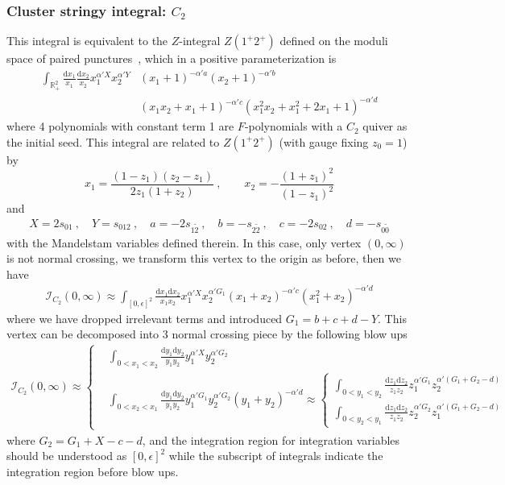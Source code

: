 \documentclass[12pt]{article}
\theoremstyle{definition}
\theoremstyle{plain}
\newcommand{\dif}{\mathrm{d}} %
\begin{document}
\subsubsection*{Cluster stringy integral: $C_2$}
This integral is equivalent to the $Z$-integral $Z(1^{+}2^{+})$ defined on the moduli space of paired punctures~\cite{Li:2018mnq}, which in a positive parameterization is 
\begin{align*}
\int_{\mathbb R_+^2} \frac{\dif x_1}{x_1}\frac{\dif x_2}{x_2}x_1^{\alpha' X}x_2^{\alpha' Y}
&(x_1 + 1)^{-\alpha' a} 
(x_2 + 1)^{-\alpha' b}\\
&(x_1x_2 + x_1 + 1)^{-\alpha' c}
(x_1^2x_2 + x_1^2 + 2x_1 + 1)^{-\alpha' d} 
\end{align*}
where 4 polynomials with constant term 1 are $F$-polynomials with a $C_{2}$ quiver as the initial seed.
This integral are related to $Z(1^{+}2^{+})$ (with gauge fixing $z_{0}=1$) by 
\begin{equation*}
	x_{1}=\frac{(1-z_{1})(z_{2}-z_{1})}{2z_{1}(1+z_{2})} \:,\qquad x_{2}=-\frac{(1+z_{1})^{2}}{(1-z_{1})^{2}}
\end{equation*}
and
\begin{align*}
	X=2s_{01}\:,\quad Y=s_{012}\:,\quad a=-2s_{1\tilde{2}}\:,\quad b=-s_{2\tilde{2}}\:,\quad 
	c=-2s_{02}\:,\quad d=-s_{0\tilde{0}}
\end{align*}
with the Mandelstam variables defined therein. In this case, only vertex $(0,\infty)$ is not normal crossing, we transform this vertex to the origin as before, then we have
\begin{align*}
	\mathcal{I}_{C_{2}}(0,\infty)\approx \int_{[0,\epsilon]^{2}} \frac{\dif x_{1}\dif x_{2}}{x_{1}x_{2}} x_{1}^{\alpha' X}x_{2}^{\alpha' G_{1}}
	(x_{1}+x_{2})^{-\alpha' c} (x_{1}^{2}+x_{2})^{-\alpha' d}
\end{align*}
where we have dropped irrelevant terms and introduced $G_{1}=b+c+d-Y$. This vertex can be decomposed into 3 normal crossing piece by the following blow ups
\begin{align*}
	\mathcal{I}_{C_{2}}(0,\infty)\approx\left\{
	\begin{aligned}
		&\int_{0<x_{1}<x_{2}}\frac{\dif y_{1}\dif y_{2}}{y_{1}y_{2}} y_{1}^{\alpha' X}y_{2}^{\alpha' G_{2}} \\
		&\int_{0<x_{2}<x_{1}}\frac{\dif y_{1}\dif y_{2}}{y_{1}y_{2}} y_{1}^{\alpha' G_{1}}y_{2}^{\alpha' G_{2}}(y_{1}+y_{2})^{-\alpha'd} \approx
		\left\{\begin{aligned}
			\int_{0<y_{1}<y_{2}}\frac{\dif z_{1} \dif z_{2}}{z_{1}z_{2}}z_{1}^{\alpha' G_{1}}
			z_{2}^{\alpha'(G_{1}+G_{2}-d)} \\
			\int_{0<y_{2}<y_{1}}\frac{\dif z_{1}\dif z_{2}}{z_{1}z_{2}} z_{2}^{\alpha' G_{2}}
			z_{1}^{\alpha'(G_{1}+G_{2}-d)}
		\end{aligned} \right. 
	\end{aligned} \right.
\end{align*}
where $G_{2}=G_{1}+X-c-d$, and the integration region for integration variables should be understood as $[0,\epsilon]^{2}$ while the subscript of integrals indicate the integration region before blow ups.
\end{document}
